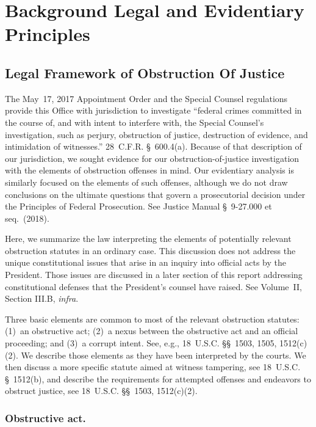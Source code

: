 \section{Background Legal and Evidentiary Principles}

\subsection{Legal Framework of Obstruction Of Justice}

The May~17, 2017 Appointment Order and the Special Counsel regulations provide this Office with jurisdiction to investigate ``federal crimes committed in the course of, and with intent to interfere with, the Special Counsel's investigation, such as perjury, obstruction of justice, destruction of evidence, and intimidation of witnesses.''
28~C.F.R. \S~600.4(a).
Because of that description of our jurisdiction, we sought evidence for our obstruction-of-justice investigation with the elements of obstruction offenses in mind.
Our evidentiary analysis is similarly focused on the elements of such offenses, although we do not draw conclusions on the ultimate questions that govern a prosecutorial decision under the Principles of Federal Prosecution.
See Justice Manual \S~9-27.000 et seq.~(2018).

Here, we summarize the law interpreting the elements of potentially relevant obstruction statutes in an ordinary case.
This discussion does not address the unique constitutional issues that arise in an inquiry into official acts by the President.
Those issues are discussed in a later section of this report addressing constitutional defenses that the President's counsel have raised. See Volume~II, Section III.B, \textit{infra}.

Three basic elements are common to most of the relevant obstruction statutes: (1)~an obstructive act; (2)~a nexus between the obstructive act and an official proceeding; and (3)~a corrupt intent.
See, e.g., 18~U.S.C. \S\S~1503, 1505, 1512(c)(2).
We describe those elements as they have been interpreted by the courts.
We then discuss a more specific statute aimed at witness tampering, see 18~U.S.C. \S~1512(b), and describe the requirements for attempted offenses and endeavors to obstruct justice, see 18~U.S.C. \S\S~1503, 1512(c)(2).

\subsubsection*{Obstructive act.}

